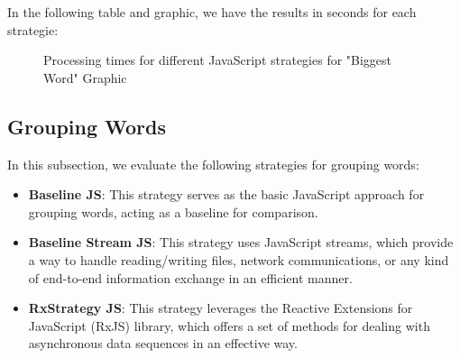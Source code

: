 In the following table and graphic, we have the results in seconds for each strategie:

\begin{table}[H]
    \centering
    \caption{Processing times for different JavaScript strategies for "Biggest Word".}
    \label{tab:strategies_times_biggest_word_js}
\end{table}

\begin{figure}[H]
    \raggedright
    \caption{Processing times for different JavaScript strategies for "Biggest Word" Graphic}
    \label{fig:biggest_word_processing_times_js}
\end{figure}

\clearpage


\subsection{Grouping Words}
\label{subsec:grouping_words_js}

In this subsection, we evaluate the following strategies for grouping words:

\begin{itemize}
    \item \textbf{Baseline JS}: This strategy serves as the basic JavaScript approach for grouping words, acting as a baseline for comparison.
    \item \textbf{Baseline Stream JS}: This strategy uses JavaScript streams, which provide a way to handle reading/writing files, network communications, or any kind of end-to-end information exchange in an efficient manner.
    \item \textbf{RxStrategy JS}: This strategy leverages the Reactive Extensions for JavaScript (RxJS) library, which offers a set of methods for dealing with asynchronous data sequences in an effective way.
\end{itemize}

